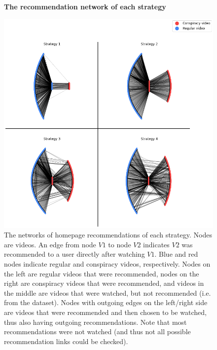 \documentclass[../main.tex]{subfiles}
\begin{document}
\begin{figure}
  \textbf{The recommendation network of each strategy}\par\medskip
  \centering
  \includegraphics[keepaspectratio, width=\textwidth]{images/recommendation networks.png}
  \caption{The networks of homepage recommendations of each strategy. Nodes are videos. An edge from node $V1$ to node $V2$ indicates $V2$ was recommended to a user directly after watching $V1$. Blue and red nodes indicate regular and conspiracy videos, respectively. Nodes on the left are regular videos that were recommended, nodes on the right are conspiracy videos that were recommended, and videos in the middle are videos that were watched, but not recommended (i.e. from the dataset). Nodes with outgoing edges on the left/right side are videos that were recommended and then chosen to be watched, thus also having outgoing recommendations. Note that most recommendations were not watched (and thus not all possible recommendation links could be checked).}
  \label{fig:rec_net}
\end{figure}

\newpage
\end{document}
